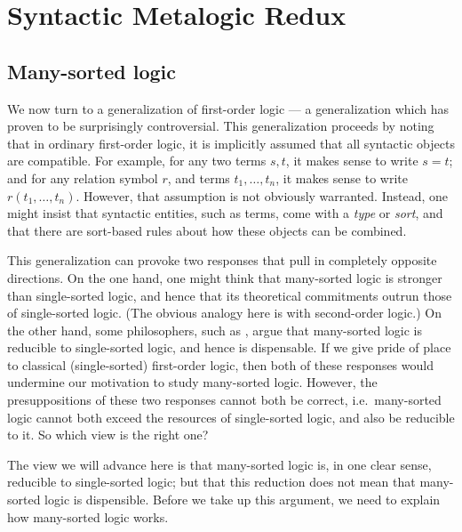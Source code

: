 \chapter{Syntactic Metalogic Redux} \label{chap-second}


\section{Many-sorted logic}

We now turn to a generalization of first-order logic --- a
generalization which has proven to be surprisingly controversial.
This generalization proceeds by noting that in ordinary first-order
logic, it is implicitly assumed that all syntactic objects are
compatible.  For example, for any two terms $s,t$, it makes sense to
write $s=t$; and for any relation symbol $r$, and terms
$t_1,\dots ,t_n$, it makes sense to write $r(t_1,\dots ,t_n)$.
However, that assumption is not obviously warranted.  Instead, one
might insist that syntactic entities, such as terms, come with a
\emph{type} or \emph{sort}, and that there are sort-based rules about
how these objects can be combined.

This generalization can provoke two responses that pull in completely
opposite directions.  On the one hand, one might think that
many-sorted logic is stronger than single-sorted logic, and hence that
its theoretical commitments outrun those of single-sorted logic.  (The
obvious analogy here is with second-order logic.)  On the other hand,
some philosophers, such as \cite[267--268]{quine1963}, argue that
many-sorted logic is reducible to single-sorted logic, and hence is
dispensable.  If we give pride of place to classical (single-sorted)
first-order logic, then both of these responses would undermine our
motivation to study many-sorted logic.  However, the presuppositions
of these two responses cannot both be correct, i.e.\ many-sorted logic
cannot both exceed the resources of single-sorted logic, and also be
reducible to it.  So which view is the right one?

The view we will advance here is that many-sorted logic is, in one
clear sense, reducible to single-sorted logic; but that this reduction
does not mean that many-sorted logic is dispensible.  Before we take
up this argument, we need to explain how many-sorted logic works.

